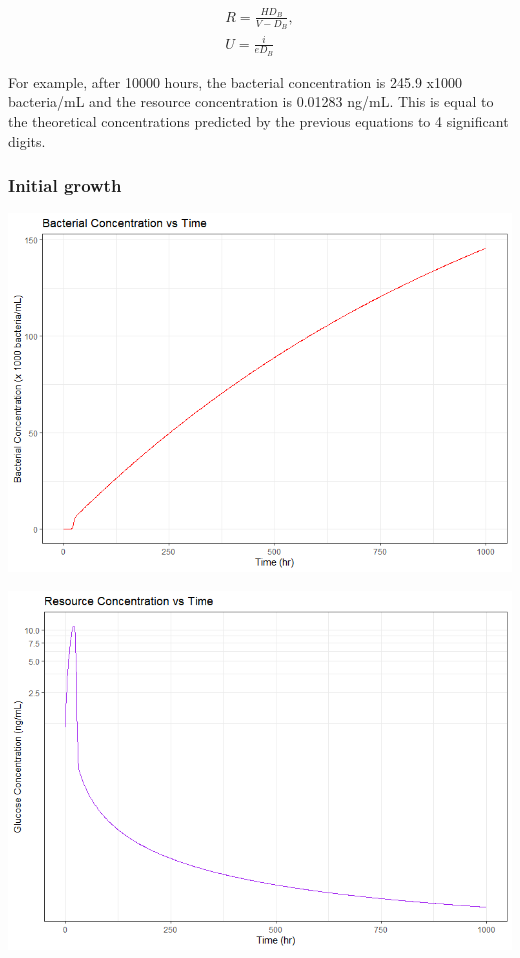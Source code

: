 \documentclass{article}
\begin{document}
\begin{equation}
\begin{split}
R = \frac{HD_B}{V - D_B}, \\ U = \frac{i}{eD_B}
\end{split}
\end{equation}

For example, after 10000 hours, the bacterial concentration is 245.9 x1000 bacteria/mL and the resource concentration is 0.01283 ng/mL. This is equal to the theoretical concentrations predicted by the previous equations to 4 significant digits.

\subsubsection{Initial growth}
\includegraphics[scale=0.5]{plots/NoPhage_U_zoomed.png}

\includegraphics[scale=0.5]{plots/NoPhage_R_zoomed.png}
\end{document}
